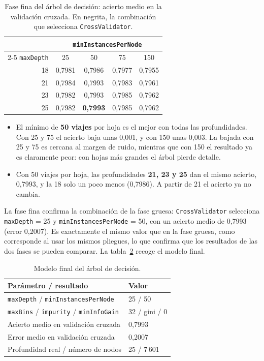 \documentclass[12pt,a4paper]{article}
\begin{document}
\begin{table}[H]
\centering
\small
\begin{tabular}{rcccc}
\toprule
 & \multicolumn{4}{c}{\texttt{minInstancesPerNode}} \\
\cmidrule(lr){2-5}
\texttt{maxDepth} & 25 & 50 & 75 & 150 \\
\midrule
18 & 0,7981 & 0,7986 & 0,7977 & 0,7955 \\
21 & 0,7984 & 0,7993 & 0,7983 & 0,7961 \\
23 & 0,7982 & 0,7993 & 0,7985 & 0,7962 \\
25 & 0,7982 & \textbf{0,7993} & 0,7985 & 0,7962 \\
\bottomrule
\end{tabular}
\caption{Fase fina del árbol de decisión: acierto medio en la validación
cruzada. En negrita, la combinación que selecciona \texttt{CrossValidator}.}
\label{tab:dt-fase2}
\end{table}
 
\begin{itemize}
    \item El mínimo de \textbf{50 viajes} por hoja es el mejor con todas las
    profundidades. Con 25 y 75 el acierto baja unas 0,001, y con 150 unas
    0,003. La bajada con 25 y 75 es cercana al margen de ruido, mientras
    que con 150 el resultado ya es claramente peor: con hojas más grandes
    el árbol pierde detalle.
    \item Con 50 viajes por hoja, las profundidades \textbf{21, 23 y 25} dan
    el mismo acierto, 0,7993, y la 18 solo un poco menos (0,7986). A partir
    de 21 el acierto ya no cambia.
\end{itemize}
 
La fase fina confirma la combinación de la fase gruesa: \texttt{CrossValidator}
selecciona \texttt{maxDepth} = 25 y \texttt{minInstancesPerNode} = 50, con
un acierto medio de 0,7993 (error 0,2007). Es exactamente el mismo valor
que en la fase gruesa, como corresponde al usar los mismos pliegues, lo que
confirma que los resultados de las dos fases se pueden comparar. La
tabla~\ref{tab:dt-final} recoge el modelo final.
 
\begin{table}[H]
\centering
\small
\begin{tabular}{ll}
\toprule
\textbf{Parámetro / resultado} & \textbf{Valor} \\
\midrule
\texttt{maxDepth} / \texttt{minInstancesPerNode} & 25 / 50 \\
\texttt{maxBins} / \texttt{impurity} / \texttt{minInfoGain} & 32 / gini / 0 \\
Acierto medio en validación cruzada & 0,7993 \\
Error medio en validación cruzada & 0,2007 \\
Profundidad real / número de nodos & 25 / 7\,601 \\
\bottomrule
\end{tabular}
\caption{Modelo final del árbol de decisión.}
\label{tab:dt-final}
\end{table}
\end{document}
